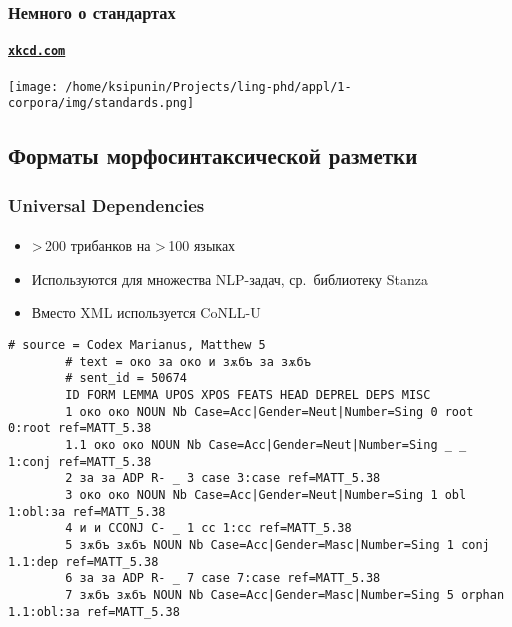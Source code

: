 \begin{frame}
    \frametitle{Немного о стандартах}
    \framesubtitle{\href{https://xkcd.com/927}{\texttt{xkcd.com}}}
    \centering
    \texttt{[image: /home/ksipunin/Projects/ling-phd/appl/1-corpora/img/standards.png]}
\end{frame}

\subsection{Форматы морфосинтаксической разметки}


\begin{frame}[fragile]
    \frametitle{Universal Dependencies}
    \framesubtitle{\autocite{universal_dependencies}}

    \begin{itemize}
        \item >\,200 трибанков на >\,100 языках
        \item Используются для множества NLP-задач, ср.\ библиотеку Stanza
        \item Вместо XML используется CoNLL-U
    \end{itemize}

    \vfill

    \begin{Verbatim}[fontsize=\scriptsize, gobble=8]
        # source = Codex Marianus, Matthew 5
        # text = око за око и зѫбъ за зѫбъ
        # sent_id = 50674
        ID FORM LEMMA UPOS XPOS FEATS HEAD DEPREL DEPS MISC
        1 око око NOUN Nb Case=Acc|Gender=Neut|Number=Sing 0 root 0:root ref=MATT_5.38
        1.1 око око NOUN Nb Case=Acc|Gender=Neut|Number=Sing _ _ 1:conj ref=MATT_5.38
        2 за за ADP R- _ 3 case 3:case ref=MATT_5.38
        3 око око NOUN Nb Case=Acc|Gender=Neut|Number=Sing 1 obl 1:obl:за ref=MATT_5.38
        4 и и CCONJ C- _ 1 cc 1:cc ref=MATT_5.38
        5 зѫбъ зѫбъ NOUN Nb Case=Acc|Gender=Masc|Number=Sing 1 conj 1.1:dep ref=MATT_5.38
        6 за за ADP R- _ 7 case 7:case ref=MATT_5.38
        7 зѫбъ зѫбъ NOUN Nb Case=Acc|Gender=Masc|Number=Sing 5 orphan 1.1:obl:за ref=MATT_5.38
    \end{Verbatim}
\end{frame}

